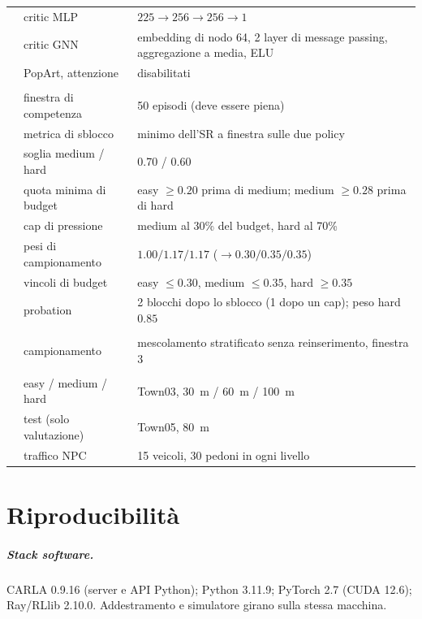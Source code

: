 \begin{table}[!htbp]
\begin{tabular}{@{}llL{9.0cm}@{}}
    & critic MLP & $225 \to 256 \to 256 \to 1$ \\
    & critic GNN & embedding di nodo 64, 2 layer di message passing, aggregazione a media, ELU \\
    & PopArt, attenzione & disabilitati \\
    \addlinespace
     \\
    & finestra di competenza & 50 episodi (deve essere piena) \\
    & metrica di sblocco & minimo dell'SR a finestra sulle due policy \\
    & soglia medium / hard & 0.70 / 0.60 \\
    & quota minima di budget & easy $\geq 0.20$ prima di medium; medium $\geq 0.28$ prima di hard \\
    & cap di pressione & medium al 30\% del budget, hard al 70\% \\
    & pesi di campionamento & $1.00 / 1.17 / 1.17$ ($\to 0.30/0.35/0.35$) \\
    & vincoli di budget & easy $\leq 0.30$, medium $\leq 0.35$, hard $\geq 0.35$ \\
    & probation & 2 blocchi dopo lo sblocco (1 dopo un cap); peso hard $0.85$ \\
    \addlinespace
     \\
    & campionamento & mescolamento stratificato senza reinserimento, finestra 3 \\
    \addlinespace
     \\
    & easy / medium / hard & Town03, \SI{30}{m} / \SI{60}{m} / \SI{100}{m} \\
    & test (solo valutazione) & Town05, \SI{80}{m} \\
    & traffico NPC & 15 veicoli, 30 pedoni in ogni livello \\
    \bottomrule
  \end{tabular}
\end{table}

\chapter{Riproducibilità}
\label{app:riproducibilita}

\paragraph{Stack software.}
CARLA 0.9.16 (server e API Python); Python 3.11.9; PyTorch 2.7
(CUDA 12.6); Ray/RLlib 2.10.0. Addestramento e simulatore girano sulla
stessa macchina.

